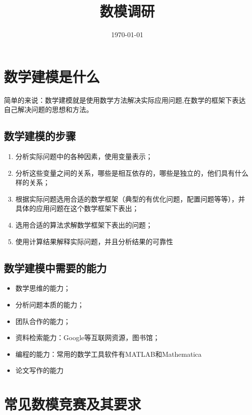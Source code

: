 \documentclass[11pt, a4paper, UTF8]{ctexart}
\title{数模调研}
\date{\today}     %
\begin{document}
\maketitle
\tableofcontents
\newpage
\section{数学建模是什么}
简单的来说：数学建模就是使用数学方法解决实际应用问题,在数学的框架下表达自己解决问题的思想和方法。\\

\subsection{数学建模的步骤}
\begin{enumerate}
\item 分析实际问题中的各种因素，使用变量表示；
\item 分析这些变量之间的关系，哪些是相互依存的，哪些是独立的，他们具有什么样的关系；
\item 根据实际问题选用合适的数学框架（典型的有优化问题，配置问题等等），并具体的应用问题在这个数学框架下表出；
\item 选用合适的算法求解数学框架下表出的问题；
\item 使用计算结果解释实际问题，并且分析结果的可靠性
\end{enumerate}

\subsection{数学建模中需要的能力}
\begin{itemize}
\item 数学思维的能力；
\item 分析问题本质的能力；
\item 团队合作的能力；
\item 资料检索能力：Google等互联网资源，图书馆；
\item 编程的能力：常用的数学工具软件有MATLAB和Mathematica
\item 论文写作的能力
\end{itemize}

\section{常见数模竞赛及其要求}
\end{document}
